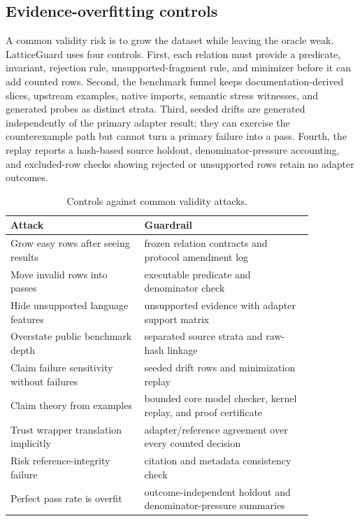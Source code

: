 \documentclass[10pt,conference]{IEEEtran}
\begin{document}
\subsection{Evidence-overfitting controls}
A common validity risk is to grow the dataset while leaving the oracle weak.  LatticeGuard uses four controls.  First, each relation must provide a predicate, invariant, rejection rule, unsupported-fragment rule, and minimizer before it can add counted rows.  Second, the benchmark funnel keeps documentation-derived slices, upstream examples, native imports, semantic stress witnesses, and generated probes as distinct strata.  Third, seeded drifts are generated independently of the primary adapter result; they can exercise the counterexample path but cannot turn a primary failure into a pass.  Fourth, the replay reports a hash-based source holdout, denominator-pressure accounting, and excluded-row checks showing rejected or unsupported rows retain no adapter outcomes.

\begin{table}[t]
\centering
\caption{Controls against common validity attacks.}
\label{tab:overfit}
\begin{tabular}{p{0.38\linewidth}p{0.48\linewidth}}
\toprule
Attack & Guardrail \\
\midrule
Grow easy rows after seeing results & frozen relation contracts and protocol amendment log \\
Move invalid rows into passes & executable predicate and denominator check \\
Hide unsupported language features & unsupported evidence with adapter support matrix \\
Overstate public benchmark depth & separated source strata and raw-hash linkage \\
Claim failure sensitivity without failures & seeded drift rows and minimization replay \\
Claim theory from examples & bounded core model checker, kernel replay, and proof certificate \\
Trust wrapper translation implicitly & adapter/reference agreement over every counted decision \\
Risk reference-integrity failure & citation and metadata consistency check \\
Perfect pass rate is overfit & outcome-independent holdout and denominator-pressure summaries \\
\bottomrule
\end{tabular}
\end{table}
\end{document}
